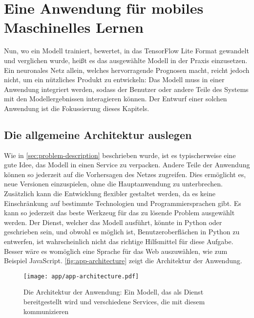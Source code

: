 \chapter{Eine Anwendung für mobiles Maschinelles Lernen}
\label{chap:application}
Nun, wo ein Modell trainiert, bewertet,
in das TensorFlow Lite Format gewandelt und verglichen wurde,
heißt es das ausgewählte Modell in der Praxis einzusetzen.
Ein neuronales Netz allein, welches hervorragende Prognosen
macht, reicht jedoch nicht, um ein nützliches Produkt zu entwickeln:
Das Modell muss in einer Anwendung integriert werden, sodass
der Benutzer oder andere Teile des Systems
mit den Modellergebnissen interagieren können.
Der Entwurf einer solchen Anwendung ist die
Fokussierung dieses Kapitels.

\section{Die allgemeine Architektur auslegen}
Wie in \autoref{sec:problem-description} beschrieben wurde, ist es
typischerweise eine gute Idee, das Modell in einen Service zu verpacken.
Andere Teile der Anwendung können so jederzeit auf die Vorhersagen
des Netzes zugreifen. Dies ermöglicht es, neue Versionen
einzuspielen, ohne die Hauptanwendung zu unterbrechen.
Zusätzlich kann die Entwicklung flexibler gestaltet werden,
da es keine Einschränkung auf bestimmte Technologien
und Programmiersprachen gibt. Es kann so jederzeit das
beste Werkzeug für das zu lösende Problem ausgewählt werden.
Der Dienst, welcher das Modell ausführt, könnte in Python oder \cpp{}
geschrieben sein, und obwohl es möglich ist, Benutzeroberflächen 
in Python zu entwerfen, ist \cpp{} wahrscheinlich nicht das
richtige Hilfsmittel für diese Aufgabe.
Besser wäre es womöglich eine Sprache für das Web auszuwählen, 
wie zum Beispiel JavaScript.
\autoref{fig:app-architecture} zeigt die Architektur der Anwendung.
\begin{figure}[h!]
  \centering
  \texttt{[image: app/app-architecture.pdf]}
  \caption{Die Architektur der Anwendung: Ein Modell, das als Dienst
  bereitgestellt wird und verschiedene Services, die mit diesem kommunizieren}
  \label{fig:app-architecture}
\end{figure}

